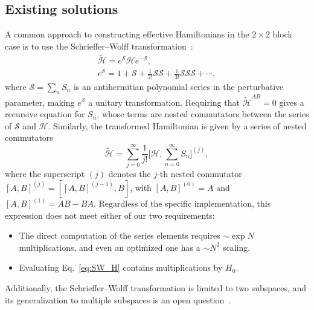 \subsection{Existing solutions}
A common approach to constructing effective Hamiltonians in the $2\times 2$ block case is to use the Schrieffer--Wolff transformation~\cite{Schrieffer_1966}:
%
\begin{equation}
\begin{aligned}
\tilde{\mathcal{H}} = e^\mathcal{S} \mathcal{H} e^{-\mathcal{S}}, \\
e^{\mathcal{S}} = 1 + \mathcal{S} + \frac{1}{2!} \mathcal{S} \mathcal{S}
+ \frac{1}{3!} \mathcal{S} \mathcal{S} \mathcal{S} + \cdots,
\end{aligned}
\end{equation}
%
where $\mathcal{S} = \sum_n S_n$ is an antihermitian polynomial series in the perturbative parameter, making $e^\mathcal{S}$ a unitary transformation.
Requiring that $\tilde{\mathcal{H}}^{AB} = 0$ gives a recursive equation for $S_n$, whose terms are nested commutators between the series of $\mathcal{S}$ and $\mathcal{H}$.
Similarly, the transformed Hamiltonian is given by a series of nested commutators
%
\begin{equation}
\label{eq:SW_H}
\tilde{\mathcal{H}} = \sum_{j=0}^\infty \frac{1}{j!} \Big [\mathcal{H}, \sum_{n=0}^{\infty} S_n \Big ]^{(j)},
\end{equation}
%
where the superscript $(j)$ denotes the $j$-th nested commutator $[A, B]^{(j)} = [[A, B]^{(j-1)}, B]$, with $[A, B]^{(0)} = A$ and $[A, B]^{(1)} = AB - BA$.
Regardless of the specific implementation, this expression does not meet either of our two requirements:
\begin{itemize}
  \item The direct computation of the series elements requires $\sim \exp N$ multiplications, and even an optimized one has a $\sim N^2$ scaling.
  \item Evaluating Eq.~\eqref{eq:SW_H} contains multiplications by $H_0$.
\end{itemize}
Additionally, the Schrieffer--Wolff transformation is limited to two subspaces, and its generalization to multiple subspaces is an open question~\cite{Mankodi_2024}.

